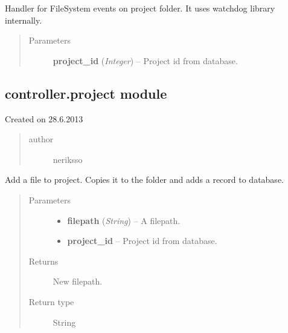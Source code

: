 \documentclass[letterpaper,10pt,english]{sphinxmanual}
\begin{document}
\begin{fulllineitems}
\label{controller:controller.handlers.PROJECT_EVENT_HANDLER}
Handler for FileSystem events on project folder.
It uses watchdog library internally.
\begin{quote}\begin{description}
\item[{Parameters}] \leavevmode
\textbf{project\_id} (\emph{Integer}) -- Project id from database.

\end{description}\end{quote}

\end{fulllineitems}



\subsection{controller.project module}
\label{controller:controller-project-module}\label{controller:module-controller.project}
Created on 28.6.2013
\begin{quote}\begin{description}
\item[{author}] \leavevmode
neriksso

\end{description}\end{quote}

\begin{fulllineitems}
\label{controller:controller.project.add_file_to_project}
Add a file to project. Copies it to the folder and adds a record to
database.
\begin{quote}\begin{description}
\item[{Parameters}] \leavevmode\begin{itemize}
\item {} 
\textbf{filepath} (\emph{String}) -- A filepath.

\item {} 
\textbf{project\_id} -- Project id from database.

\end{itemize}

\item[{Returns}] \leavevmode
New filepath.

\item[{Return type}] \leavevmode
String

\end{description}\end{quote}

\end{fulllineitems}
\end{document}
